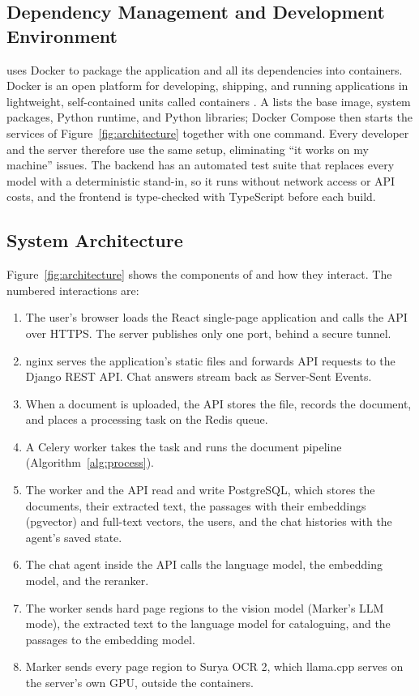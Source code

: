 \subsection{Dependency Management and Development Environment}

\cs{} uses Docker to package the application and all its dependencies into containers. Docker is an open platform for developing, shipping, and running applications in lightweight, self-contained units called containers \citep{docker2024}. A  lists the base image, system packages, Python runtime, and Python libraries; Docker Compose then starts the services of Figure~\ref{fig:architecture} together with one command. Every developer and the server therefore use the same setup, eliminating ``it works on my machine'' issues. The backend has an automated test suite that replaces every model with a deterministic stand-in, so it runs without network access or API costs, and the frontend is type-checked with TypeScript before each build.

\subsection{System Architecture}\label{sec:architecture}

Figure~\ref{fig:architecture} shows the components of \cs{} and how they interact. The numbered interactions are:

\begin{enumerate}[label=(\arabic*)]
  \item The user's browser loads the React single-page application and calls the API over HTTPS. The server publishes only one port, behind a secure tunnel.
  \item nginx serves the application's static files and forwards API requests to the Django REST API. Chat answers stream back as Server-Sent Events.
  \item When a document is uploaded, the API stores the file, records the document, and places a processing task on the Redis queue.
  \item A Celery worker takes the task and runs the document pipeline (Algorithm~\ref{alg:process}).
  \item The worker and the API read and write PostgreSQL, which stores the documents, their extracted text, the passages with their embeddings (pgvector) and full-text vectors, the users, and the chat histories with the agent's saved state.
  \item The chat agent inside the API calls the language model, the embedding model, and the reranker.
  \item The worker sends hard page regions to the vision model (Marker's LLM mode), the extracted text to the language model for cataloguing, and the passages to the embedding model.
  \item Marker sends every page region to Surya OCR 2, which llama.cpp serves on the server's own GPU, outside the containers.
\end{enumerate}

